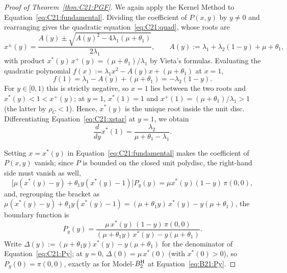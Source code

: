 \begin{proof}[Proof of Theorem~\ref{thm:C21:PGF}]
    We again apply the Kernel Method to Equation~\eqref{eq:C21:fundamental}. Dividing the coefficient of $P(x,y)$ by $y\ne0$ and rearranging gives the quadratic equation~\eqref{eq:C21:quad}, whose roots are
    \begin{equation}
        x^{\pm}(y) = \frac{A(y) \pm \sqrt{A(y)^2 - 4\lambda_1(\mu+\theta_1)}}{2\lambda_1},
        \qquad A(y):=\lambda_1+\lambda_2(1-y)+\mu+\theta_1,
        \label{eq:C21:xstar}
    \end{equation}
    with product $x^*(y)\,x^+(y)=(\mu+\theta_1)/\lambda_1$ by Vieta's formulas. Evaluating the quadratic polynomial $f(x):=\lambda_1 x^2-A(y)x+(\mu+\theta_1)$ at $x=1$,
    \begin{equation*}
        f(1) = \lambda_1 - A(y) + (\mu+\theta_1) = -\lambda_2(1-y).
    \end{equation*}
    For $y\in[0,1)$ this is strictly negative, so $x=1$ lies between the two roots and $x^*(y)<1<x^+(y)$; at $y=1$, $x^*(1)=1$ and $x^+(1)=(\mu+\theta_1)/\lambda_1>1$ (the latter by $\rho_C<1$). Hence, $x^*(y)$ is the unique root inside the unit disc. Differentiating Equation~\eqref{eq:C21:xstar} at $y=1$, we obtain
    \begin{equation}
        \frac{d}{dy}x^*(1) = \frac{\lambda_2}{\mu+\theta_1-\lambda_1}.
        \label{eq:C21:xstar_deriv}
    \end{equation}

    Setting $x=x^*(y)$ in Equation~\eqref{eq:C21:fundamental} makes the coefficient of $P(x,y)$ vanish; since $P$ is bounded on the closed unit polydisc, the right-hand side must vanish as well,
    \begin{equation*}
        \bigl[\mu(x^*(y)-y)+\theta_1 y(x^*(y)-1)\bigr]P_y(y) = \mu x^*(y)(1-y)\,\pi(0,0),
    \end{equation*}
    and, regrouping the bracket as
    $\mu(x^*(y)-y)+\theta_1 y(x^*(y)-1)=(\mu+\theta_1 y)\,x^*(y)-y(\mu+\theta_1)$, the boundary function is
    \begin{equation}
        P_y(y) = \frac{\mu\,x^*(y)\,(1-y)\,\pi(0,0)}
                      {(\mu+\theta_1 y)\,x^*(y)-y(\mu+\theta_1)}.
        \label{eq:C21:Py}
    \end{equation}
    Write $\Delta(y):=(\mu+\theta_1 y)x^*(y)-y(\mu+\theta_1)$ for the denominator of Equation~\eqref{eq:C21:Py}; at $y=0$, $\Delta(0)=\mu\,x^*(0)$ (with $x^*(0)>0$), so $P_y(0)=\pi(0,0)$, exactly as for Model-$B_2^{\mathrm{H}}$ at Equation~\eqref{eq:B21:Py}.
    

\end{proof}
